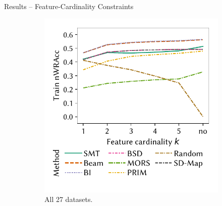 \documentclass[en, navbaroff]{sdqbeamer}
\begin{document}
\begin{frame}[t]{Results -- Feature-Cardinality Constraints}
	\begin{figure}
		\centering
		\begin{subfigure}[t]{0.35\textwidth}
			\centering
			\includegraphics[width=\textwidth, trim=10 25 10 10, clip]{plots/csd-cardinality-train-nwracc-all-datasets.pdf}
			\caption{All 27 datasets.}
			\label{fig:csd:cardinality-train-nwracc-all-datasets}
		\end{subfigure}
		\pause
		\hspace{\kitcolumnsep}
		\begin{subfigure}[t]{0.35\textwidth}

\end{subfigure}
\end{figure}
\end{frame}
\end{document}
